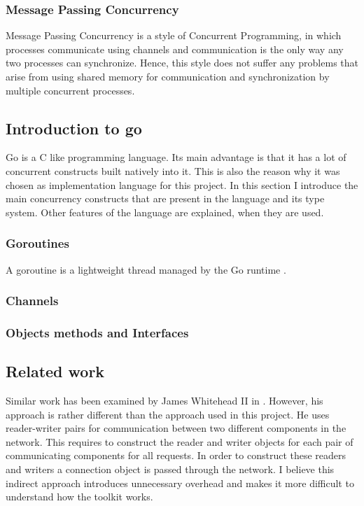 \documentclass[12pt,a4paper]{article}
\begin{document}
\subsubsection{Message Passing Concurrency}
Message Passing Concurrency is a style of Concurrent Programming, in which
processes communicate using channels and communication is the only way
any two processes can synchronize. Hence, this style does not 
suffer any problems that arise from using shared memory for communication 
and synchronization by multiple concurrent processes.


\subsection{Introduction to go}
Go is a C like programming language. Its main advantage is 
that it has a lot of concurrent constructs built natively into it.
This is also the reason why it was chosen as implementation language 
for this project.
In this section I introduce the main concurrency constructs that are
present in the language and its type system. Other features
of the language are explained, when they are used.

\subsubsection{Goroutines}
A goroutine is a lightweight thread managed by the Go runtime \cite{Tour}.

\subsubsection{Channels}
\subsubsection{Objects methods and Interfaces}


\subsection{Related work}
Similar work has been examined by James Whitehead II in \cite{whitehead}.
However, his approach is rather different than the approach used 
in this project. He uses reader-writer pairs for communication between
two different components in the network. This requires to construct the
reader and writer objects for each pair of communicating components
for all requests.
In order to construct these readers and writers a connection object is 
passed through the network.
I believe this indirect approach introduces unnecessary overhead and 
makes it more difficult to understand how the toolkit works.
\end{document}
